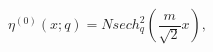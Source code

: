 \begin{equation}
\label{GS} \eta^{(0)} (x;q) =Nsech^{2}_q\left(\frac{m}{\sqrt 2}x \right),
\end{equation}

